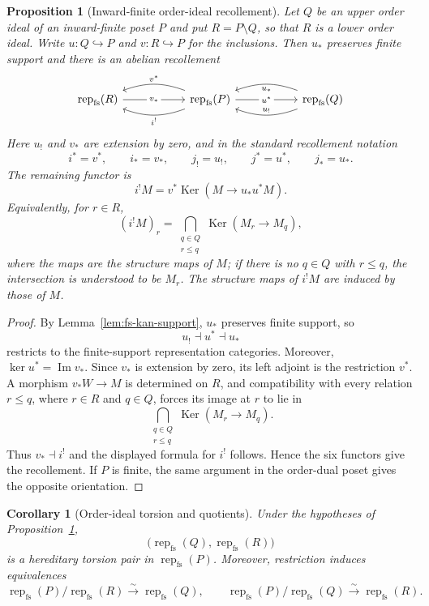 \documentclass[12pt,reqno]{amsart}
\newtheorem{proposition}[theorem]{Proposition}
\newtheorem{corollary}[theorem]{Corollary}
\theoremstyle{definition}
\theoremstyle{remark}
\newcommand{\Rep}{\operatorname{rep}}
\begin{document}
\begin{proposition}[Inward-finite order-ideal recollement]
\label{prop:fs-order-recollement}
Let $Q$ be an upper order ideal of an inward-finite poset $P$ and put
$R=P\setminus Q$, so that $R$ is a lower order ideal.  Write
$u:Q\hookrightarrow P$ and $v:R\hookrightarrow P$ for the inclusions.  Then
$u_*$ preserves finite support and there is an abelian recollement
\[
\begin{tikzcd}[column sep=5.5em]
\Rep_{\mathrm{fs}}(R)
  \arrow[r, "v_*" description]
& \Rep_{\mathrm{fs}}(P)
  \arrow[l, bend right=20, "v^*"']
  \arrow[l, bend left=20, "i^!"]
  \arrow[r, "u^*" description]
& \Rep_{\mathrm{fs}}(Q)
  \arrow[l, bend left=20, "u_!"']
  \arrow[l, bend right=20, "u_*"]
\end{tikzcd}
\]
Here $u_!$ and $v_*$ are extension by zero, and in the standard recollement
notation
\[
i^*=v^*,\qquad i_*=v_*,\qquad
j_!=u_!,\qquad j^*=u^*,\qquad j_*=u_*.
\]
The remaining functor is
\[
i^!M
=
v^*\operatorname{Ker}\!\left(M\longrightarrow u_*u^*M\right).
\]
Equivalently, for $r\in R$,
\[
(i^!M)_r
=
\bigcap_{\substack{q\in Q\\ r\le q}}
\operatorname{Ker}(M_r\longrightarrow M_q),
\]
where the maps are the structure maps of $M$; if there is no $q\in Q$ with
$r\le q$, the intersection is understood to be $M_r$.  The structure maps
of $i^!M$ are induced by those of $M$.


\end{proposition}

\begin{proof}
By Lemma~\ref{lem:fs-kan-support}, $u_*$ preserves finite support, so
\[
u_!\dashv u^*\dashv u_*
\]
restricts to the finite-support representation categories.  Moreover,
$\ker u^*=\operatorname{Im}v_*$.  Since $v_*$ is extension by zero, its
left adjoint is the restriction $v^*$.  A morphism $v_*W\to M$ is determined
on $R$, and compatibility with every relation $r\le q$, where $r\in R$ and
$q\in Q$, forces its image at $r$ to lie in
\[
\bigcap_{\substack{q\in Q\\ r\le q}}
\operatorname{Ker}(M_r\longrightarrow M_q).
\]
Thus $v_*\dashv i^!$ and the displayed formula for $i^!$ follows.  Hence the
six functors give the recollement.  If $P$ is finite, the same argument in the
order-dual poset gives the opposite orientation.
\end{proof}

\begin{corollary}[Order-ideal torsion and quotients]
\label{cor:order-ideal-consequences}
Under the hypotheses of Proposition~\ref{prop:fs-order-recollement},
\[
\bigl(\Rep_{\mathrm{fs}}(Q),\Rep_{\mathrm{fs}}(R)\bigr)
\]
is a hereditary torsion pair in $\Rep_{\mathrm{fs}}(P)$.  Moreover,
restriction induces equivalences
\[
\Rep_{\mathrm{fs}}(P)/\Rep_{\mathrm{fs}}(R)
\xrightarrow{\sim}\Rep_{\mathrm{fs}}(Q),
\qquad
\Rep_{\mathrm{fs}}(P)/\Rep_{\mathrm{fs}}(Q)
\xrightarrow{\sim}\Rep_{\mathrm{fs}}(R).
\]
\end{corollary}
\end{document}
